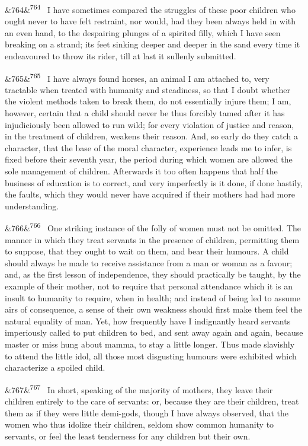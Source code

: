 \documentclass[12pt]{article}
\newcommand{\para}[1][]{\par\noindent\ifx&#1&\else\textsuperscript{\footnotesize #1}~\fi}
\begin{document}
\para[764] I have sometimes compared the struggles of these poor children who ought never to have felt restraint, nor would, had they been always held in with an even hand, to the despairing plunges of a spirited filly, which I have seen breaking on a strand; its feet sinking deeper and deeper in the sand every time it endeavoured to throw its rider, till at last it sullenly submitted.

\para[765] I have always found horses, an animal I am attached to, very tractable when treated with humanity and steadiness, so that I doubt whether the violent methods taken to break them, do not essentially injure them; I am, however, certain that a child should never be thus forcibly tamed after it has injudiciously been allowed to run wild; for every violation of justice and reason, in the treatment of children, weakens their reason. And, so early do they catch a character, that the base of the moral character, experience leads me to infer, is fixed before their seventh year, the period during which women are allowed the sole management of children. Afterwards it too often happens that half the business of education is to correct, and very imperfectly is it done, if done hastily, the faults, which they would never have acquired if their mothers had had more understanding.

\para[766] One striking instance of the folly of women must not be omitted. The manner in which they treat servants in the presence of children, permitting them to suppose, that they ought to wait on them, and bear their humours. A child should always be made to receive assistance from a man or woman as a favour; and, as the first lesson of independence, they should practically be taught, by the example of their mother, not to require that personal attendance which it is an insult to humanity to require, when in health; and instead of being led to assume airs of consequence, a sense of their own weakness should first make them feel the natural equality of man. Yet, how frequently have I indignantly heard servants imperiously called to put children to bed, and sent away again and again, because master or miss hung about mamma, to stay a little longer. Thus made slavishly to attend the little idol, all those most disgusting humours were exhibited which characterize a spoiled child.

\para[767] In short, speaking of the majority of mothers, they leave their children entirely to the care of servants: or, because they are their children, treat them as if they were little demi-gods, though I have always observed, that the women who thus idolize their children, seldom show common humanity to servants, or feel the least tenderness for any children but their own.
\end{document}
